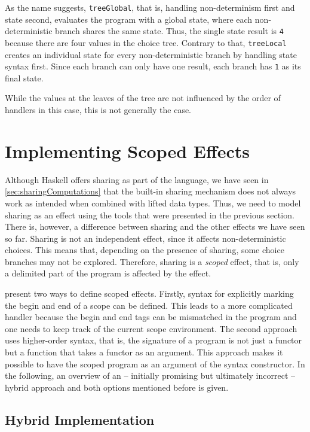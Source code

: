 \documentclass[a4paper, 11pt, fleqn, twoside]{scrreprt}
\newcommand{\hinl}[1]{\texttt{#1}}
\begin{document}
\vspace{0.32cm}

As the name suggests, \hinl{treeGlobal}, that is, handling non-determinism first and state second, evaluates the program with a global state, where each non-deterministic branch shares the same state.
Thus, the single state result is \hinl{4} because there are four values in the choice tree.
Contrary to that, \hinl{treeLocal} creates an individual state for every non-deterministic branch by handling state syntax first.
Since each branch can only have one result, each branch has \hinl{1} as its final state.

While the values at the leaves of the tree are not influenced by the order of handlers in this case, this is not generally the case.

\section{Implementing Scoped Effects}
\label{sec:sharing}

Although Haskell offers sharing as part of the language, we have seen in \autoref{sec:sharingComputations} that the built-in sharing mechanism does not always work as intended when combined with lifted data types.
Thus, we need to model sharing as an effect using the tools that were presented in the previous section.
There is, however, a difference between sharing and the other effects we have seen so far.
Sharing is not an independent effect, since it affects non-deterministic choices.
This means that, depending on the presence of sharing, some choice branches may not be explored.
Therefore, sharing is a \textit{scoped} effect, that is, only a delimited part of the program is affected by the effect.

\citet{wu2014effect} present two ways to define scoped effects.
Firstly, syntax for explicitly marking the begin and end of a scope can be defined.
This leads to a more complicated handler because the begin and end tags can be mismatched in the program and one needs to keep track of the current scope environment.
The second approach uses higher-order syntax, that is, the signature of a program is not just a functor but a function that takes a functor as an argument.
This approach makes it possible to have the scoped program as an argument of the syntax constructor.
In the following, an overview of an  -- initially promising but ultimately incorrect  -- hybrid approach and both options mentioned before is given.

\subsection{Hybrid Implementation}
\end{document}
